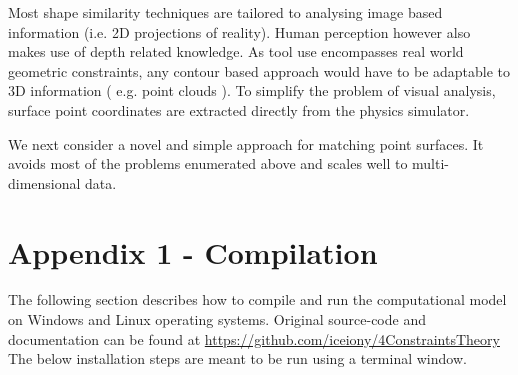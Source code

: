 \documentclass[
    a4paper,
    man,
    floatsintext,
    british
]{apa6}
\begin{document}
Most shape similarity techniques are tailored to analysing image based information (i.e. 2D projections of reality). Human perception however also makes use of depth related knowledge. As tool use encompasses real world geometric constraints, any contour based approach would have to be adaptable to 3D information ( e.g. point clouds ). To simplify the problem of visual analysis, surface point coordinates are extracted directly from the physics simulator. 

We next consider a novel and simple approach for matching point surfaces. It avoids most of the problems enumerated above and scales well to multi-dimensional data.  



\section{Appendix 1 - Compilation}
The following section describes how to compile and run the computational model on Windows and Linux operating systems. 
Original source-code and documentation can be found at \url{https://github.com/iceiony/4ConstraintsTheory}
The below installation steps are meant to be run using a terminal window.
\end{document}
